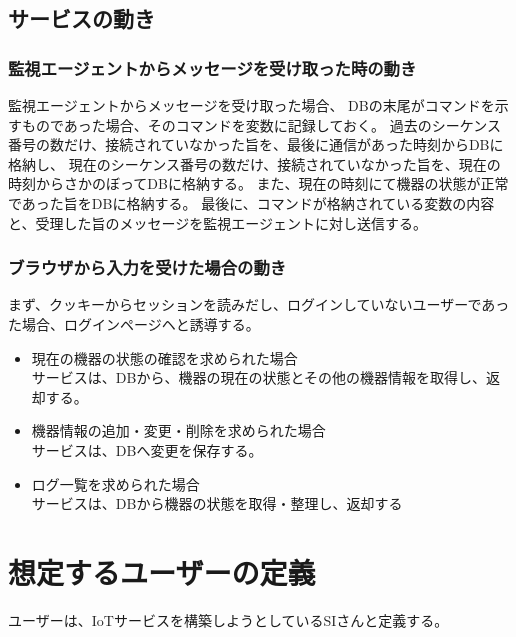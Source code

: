 \subsection{サービスの動き}
\subsubsection{監視エージェントからメッセージを受け取った時の動き}
監視エージェントからメッセージを受け取った場合、
DBの末尾がコマンドを示すものであった場合、そのコマンドを変数に記録しておく。
過去のシーケンス番号の数だけ、接続されていなかった旨を、最後に通信があった時刻からDBに格納し、
現在のシーケンス番号の数だけ、接続されていなかった旨を、現在の時刻からさかのぼってDBに格納する。
また、現在の時刻にて機器の状態が正常であった旨をDBに格納する。
最後に、コマンドが格納されている変数の内容と、受理した旨のメッセージを監視エージェントに対し送信する。

\subsubsection{ブラウザから入力を受けた場合の動き}
まず、クッキーからセッションを読みだし、ログインしていないユーザーであった場合、ログインページヘと誘導する。
\begin{itemize}
	\item 現在の機器の状態の確認を求められた場合\\
		サービスは、DBから、機器の現在の状態とその他の機器情報を取得し、返却する。
	\item 機器情報の追加・変更・削除を求められた場合\\
		サービスは、DBへ変更を保存する。
	\item ログ一覧を求められた場合\\
		サービスは、DBから機器の状態を取得・整理し、返却する
\end{itemize}

\section{想定するユーザーの定義}
ユーザーは、IoTサービスを構築しようとしているSIさんと定義する。

